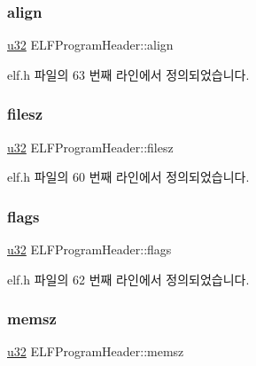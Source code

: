\subsubsection{\texorpdfstring{align}{align}}
{\footnotesize\ttfamily \mbox{\hyperlink{_system_8h_a10e94b422ef0c20dcdec20d31a1f5049}{u32}} E\+L\+F\+Program\+Header\+::align}



elf.\+h 파일의 63 번째 라인에서 정의되었습니다.

\mbox{\label{struct_e_l_f_program_header_aa74d6e39126edabc460116b7e2693469}} 
\subsubsection{\texorpdfstring{filesz}{filesz}}
{\footnotesize\ttfamily \mbox{\hyperlink{_system_8h_a10e94b422ef0c20dcdec20d31a1f5049}{u32}} E\+L\+F\+Program\+Header\+::filesz}



elf.\+h 파일의 60 번째 라인에서 정의되었습니다.

\mbox{\label{struct_e_l_f_program_header_a6e404410651c4610349928dc4dbe8a0f}} 
\subsubsection{\texorpdfstring{flags}{flags}}
{\footnotesize\ttfamily \mbox{\hyperlink{_system_8h_a10e94b422ef0c20dcdec20d31a1f5049}{u32}} E\+L\+F\+Program\+Header\+::flags}



elf.\+h 파일의 62 번째 라인에서 정의되었습니다.

\mbox{\label{struct_e_l_f_program_header_a501661133d3a1c9f9d11cd4dd582d626}} 
\subsubsection{\texorpdfstring{memsz}{memsz}}
{\footnotesize\ttfamily \mbox{\hyperlink{_system_8h_a10e94b422ef0c20dcdec20d31a1f5049}{u32}} E\+L\+F\+Program\+Header\+::memsz}



